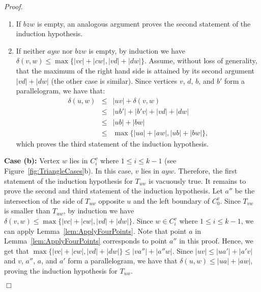 \documentclass[12pt]{article}
\newenvironment{proof}{\emph{Proof.}}{\hfill $\Box$\\}
\newcommand{\canon}[2]{\ensuremath{T_{#1 #2}}}
\begin{document}
\begin{proof}
\begin{enumerate}
  \item If $b z w$ is empty, an analogous argument proves the second statement of the induction hypothesis.

  \item If neither $a y w$ nor $b z w$ is empty, by induction we have $\delta(v, w) \leq \max\{|v c| + |c w|, |v d| + |d w|\}$. Assume, without loss of generality, that the maximum of the right hand side is attained by its second argument $|v d| + |d w|$ (the other case is similar). Since vertices $v$, $d$, $b$, and $b'$ form a parallelogram, we have that:
  \begin{eqnarray*}
    \delta(u, w) &\leq& |uv| + \delta(v, w) \\
    &\leq& |u b'| + |b' v| +  |v d| + |d w| \\
    &\leq& |u b| + |b w| \\
    &\leq& \max\{|u a| + |a w|, |u b| + |b w|\},
  \end{eqnarray*}
  which proves the third statement of the induction hypothesis. 
  \end{enumerate}

  \textbf{Case (b):} Vertex $w$ lies in $C_i^v$ where $1 \leq i \leq k-1$ (see Figure~\ref{fig:TriangleCases}b). In this case, $v$ lies in $a y w$. Therefore, the first statement of the induction hypothesis for \canon{u}{w} is vacuously true. It remains to prove the second and third statement of the induction hypothesis. Let $a''$ be the intersection of the side of $\canon{u}{w}$ opposite $u$ and the left boundary of $C_0^v$. Since $\canon{v}{w}$ is smaller than $\canon{u}{w}$, by induction we have $\delta(v, w) \leq \max\{|v c| + |c w|, |v d| + |d w|\}$. Since $w \in C_i^v$ where $1 \leq i \leq k-1$, we can apply Lemma~\ref{lem:ApplyFourPoints}. Note that point $a$ in Lemma~\ref{lem:ApplyFourPoints} corresponds to point $a''$ in this proof. Hence, we get that $\max \{|vc| + |cw|, |vd| + |dw| \} \leq |va''| + |a''w|$. Since $|u v| \leq |u a'| + |a' v|$ and $v$, $a''$, $a$, and $a'$ form a parallelogram, we have that $\delta(u, w) \leq |u a| + |a w|$, proving the induction hypothesis for \canon{u}{w}.


\end{proof}
\end{document}
